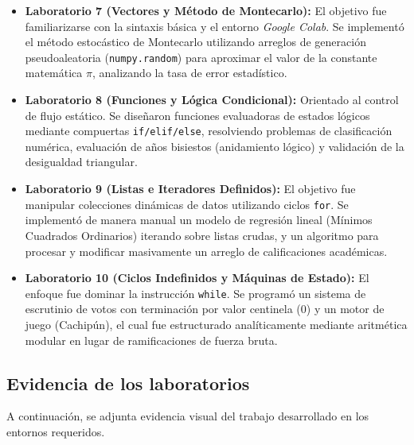\begin{itemize}
	\item \textbf{Laboratorio 7 (Vectores y Método de Montecarlo):} El objetivo fue familiarizarse con la sintaxis básica y el entorno \textit{Google Colab}. Se implementó el método estocástico de Montecarlo utilizando arreglos de generación pseudoaleatoria (\texttt{numpy.random}) para aproximar el valor de la constante matemática $\pi$, analizando la tasa de error estadístico.

	\item \textbf{Laboratorio 8 (Funciones y Lógica Condicional):} Orientado al control de flujo estático. Se diseñaron funciones evaluadoras de estados lógicos mediante compuertas \texttt{if/elif/else}, resolviendo problemas de clasificación numérica, evaluación de años bisiestos (anidamiento lógico) y validación de la desigualdad triangular.

	\item \textbf{Laboratorio 9 (Listas e Iteradores Definidos):} El objetivo fue manipular colecciones dinámicas de datos utilizando ciclos \texttt{for}. Se implementó de manera manual un modelo de regresión lineal (Mínimos Cuadrados Ordinarios) iterando sobre listas crudas, y un algoritmo para procesar y modificar masivamente un arreglo de calificaciones académicas.

	\item \textbf{Laboratorio 10 (Ciclos Indefinidos y Máquinas de Estado):} El enfoque fue dominar la instrucción \texttt{while}. Se programó un sistema de escrutinio de votos con terminación por valor centinela (0) y un motor de juego (Cachipún), el cual fue estructurado analíticamente mediante aritmética modular en lugar de ramificaciones de fuerza bruta.
\end{itemize}

\subsection{Evidencia de los laboratorios}

A continuación, se adjunta evidencia visual del trabajo desarrollado en los entornos requeridos.




